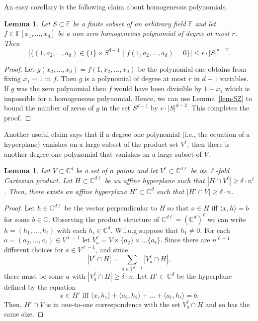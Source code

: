 \documentclass[11pt]{article}
\newtheorem{lem}[thm]{Lemma}
\def\F{{\mathbb{F}}}
\def\C{{\mathbb{C}}}
\newcommand{\ip}[2]{\langle #1,#2 \rangle}
\begin{document}
An easy corollary is the following claim about homogeneous polynomials.

\begin{lem}\label{lem-SZ-hom}
Let $S \subset \F$ be a finite subset of an arbitrary field $\F$ and let $f \in \F[x_1,\ldots,x_d]$ be a non-zero homogeneous polynomial of degree at most $r$. Then
$$   \lvert \{ (1,a_2,\ldots,a_d) \in \{1\} \times S^{d-1}  \,\,|\,\, f(1,a_2,\ldots,a_d)=0 \}\rvert \leq r \cdot |S|^{d-2}. $$
\end{lem}
\begin{proof}
Let $g(x_2,\ldots,x_d) = f(1,x_2,\ldots,x_d)$ be the polynomial one obtains from fixing $x_1=1$ in $f$. Then $g$ is a polynomial of degree at most $r$ in $d-1$ variables. If $g$ was the zero polynomial then $f$ would have been divisible by $1-x_1$ which is impossible for a homogeneous polynomial. Hence, we can use Lemma~\ref{lem-SZ} to bound the number of zeros of $g$ in the set $S^{d-1}$ by $r \cdot |S|^{d-2}$. This completes the proof.
\end{proof}
 
 Another useful claim says that if a degree one polynomial (i.e., the equation of a hyperplane) vanishes on a large subset of the product set $V^\ell$, then there is another degree one polynomial that vanishes on a large subset of $V$.
\begin{lem}\label{lem-hyperplaneproduct}
Let $V \subset \C^d$ be a set of $n$ points and let $V^\ell \subset \C^{d\ell}$ be its $\ell$-fold Cartesian product. Let $H \subset \C^{d\ell}$ be an affine hyperplane such that $|H \cap V^\ell| \geq \delta \cdot n^\ell$. Then, there exists an affine hyperplane $H' \subset \C^d$ such that $|H' \cap V| \geq \delta \cdot n$.
\end{lem}
\begin{proof}
Let $h \in \C^{d\ell}$ be the vector perpendicular to $H$ so that $x \in H$ iff $\ip{x}{h}=b$ for some $b \in \C$. Observing the product structure of $\C^{d\ell} = (\C^d)^\ell$ we can write $h = (h_1,\ldots,h_\ell)$ with each $h_i \in \C^d$. W.l.o.g suppose that $h_1 \neq 0$. For each $a = (a_2,\ldots,a_\ell) \in V^{\ell-1}$ let $V^\ell_a = V \times \{a_2\} \times \ldots \{a_\ell\}$. Since there are $n^{\ell-1}$ different choices for $a \in V^{\ell-1}$, and since 
$$ |V^\ell \cap H| = \sum_{a \in V^{\ell-1}}|V^\ell_a \cap H|, $$
 there must be some $a$ with $|V^\ell_a \cap H| \geq \delta \cdot n$. Let $H' \subset \C^d$ be the hyperplane  defined by the equation 
$$ x \in H' \,\,\text{iff}\,\, \ip{x}{h_1}+ \ip{a_2}{h_2} + \ldots + \ip{a_\ell}{h_\ell} = b. $$ Then, $H' \cap V$ is in one-to-one correspondence with the set $V^\ell_a \cap H$ and so has the same size.
 \end{proof}
\end{document}
